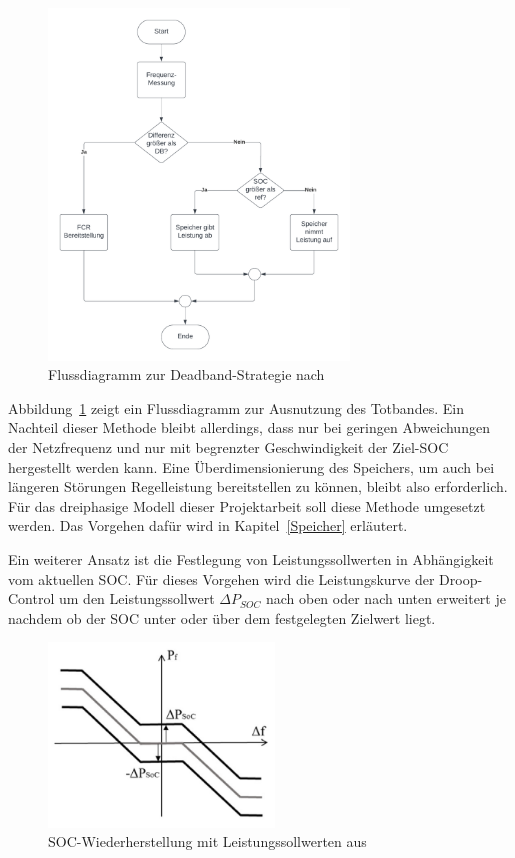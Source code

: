 \begin{figure}[h!]
    \centering
    \includegraphics[width=8cm]{Abbildungen/DBFlow.png}
    \caption{Flussdiagramm zur Deadband-Strategie nach~\parencite[]{noauthor_soc_nodate}}\label{FlowPCR}
\end{figure}

Abbildung~\ref{FlowPCR} zeigt ein Flussdiagramm zur Ausnutzung des Totbandes.
Ein Nachteil dieser Methode bleibt allerdings, dass nur bei geringen Abweichungen der Netzfrequenz und nur mit begrenzter 
Geschwindigkeit der Ziel-SOC hergestellt werden kann. 
Eine Überdimensionierung des Speichers, um auch bei längeren Störungen Regelleistung bereitstellen zu können, bleibt
also erforderlich.
Für das dreiphasige Modell dieser Projektarbeit soll diese Methode umgesetzt werden. 
Das Vorgehen dafür wird in Kapitel~\ref{Speicher} erläutert.

Ein weiterer Ansatz ist die Festlegung von Leistungssollwerten in Abhängigkeit vom aktuellen SOC.
Für dieses Vorgehen wird die Leistungskurve der Droop-Control um den Leistungssollwert $\Delta P_{SOC}$ nach oben
oder nach unten erweitert je nachdem ob der SOC unter oder über dem festgelegten Zielwert liegt.

\begin{figure}[h!]
    \centering
    \includegraphics[width=6cm]{Abbildungen/DroopErweitert.png}
    \caption{SOC-Wiederherstellung mit Leistungssollwerten aus \parencite[]{noauthor_soc_nodate}}\label{Droopplus}
\end{figure}

